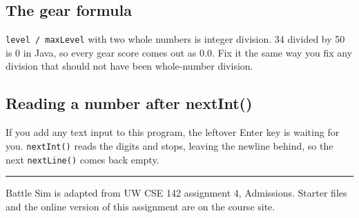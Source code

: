\documentclass[11pt]{article}
\newcommand{\code}[1]{\texttt{#1}}
\begin{document}
\subsection*{The gear formula}

\code{level / maxLevel} with two whole numbers is integer division. 34 divided by 50 is 0 in Java, so every gear score comes out as 0.0. Fix it the same way you fix any division that should not have been whole-number division.

\subsection*{Reading a number after nextInt()}

If you add any text input to this program, the leftover Enter key is waiting for you. \code{nextInt()} reads the digits and stops, leaving the newline behind, so the next \code{nextLine()} comes back empty.

\vspace{16pt}
{\color{hair}\rule{\linewidth}{0.8pt}}

{\sffamily\footnotesize\color{soft}Battle Sim is adapted from UW CSE 142 assignment 4, Admissions. Starter files and the online version of this assignment are on the course site.}
\end{document}

